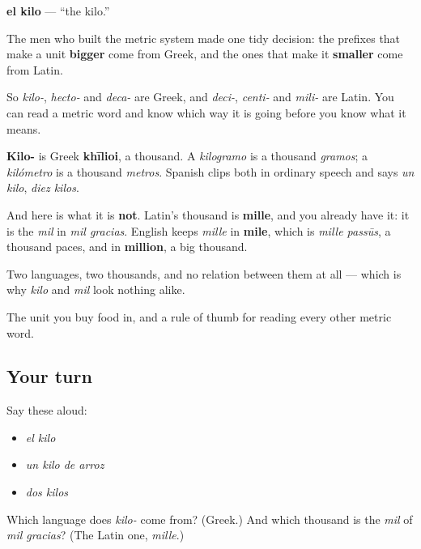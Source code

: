 \begin{cousinweb}
\textbf{el kilo} — \textquotedblleft{}the kilo.\textquotedblright{}

The men who built the metric system made one tidy decision: the prefixes that make a unit \textbf{bigger} come from Greek, and the ones that make it \textbf{smaller} come from Latin.

So \emph{kilo-}, \emph{hecto-} and \emph{deca-} are Greek, and \emph{deci-}, \emph{centi-} and \emph{mili-} are Latin. You can read a metric word and know which way it is going before you know what it means.

\textbf{Kilo-} is Greek \textbf{khīlioi}, a thousand. A \emph{kilogramo} is a thousand \emph{gramos}; a \emph{kilómetro} is a thousand \emph{metros}. Spanish clips both in ordinary speech and says \emph{un kilo}, \emph{diez kilos}.

And here is what it is \textbf{not}. Latin's thousand is \textbf{mille}, and you already have it: it is the \emph{mil} in \emph{mil gracias}. English keeps \emph{mille} in \textbf{mile}, which is \emph{mille passūs}, a thousand paces, and in \textbf{million}, a big thousand.

Two languages, two thousands, and no relation between them at all — which is why \emph{kilo} and \emph{mil} look nothing alike.
\end{cousinweb}

\begin{grammarlens}[title={What you've built}]
The unit you buy food in, and a rule of thumb for reading every other metric word.
\end{grammarlens}

\subsection*{Your turn}
Say these aloud:

\begin{itemize}
\raggedright
  \item \emph{el kilo}
  \item \emph{un kilo de arroz}
  \item \emph{dos kilos}
\end{itemize}

\begin{tcolorbox}[breakable,colback=teal!4,colframe=teal!35!black,title={Before you move on}]
Which language does \emph{kilo-} come from? (Greek.) And which thousand is the \emph{mil} of \emph{mil gracias}? (The Latin one, \emph{mille}.)
\end{tcolorbox}
